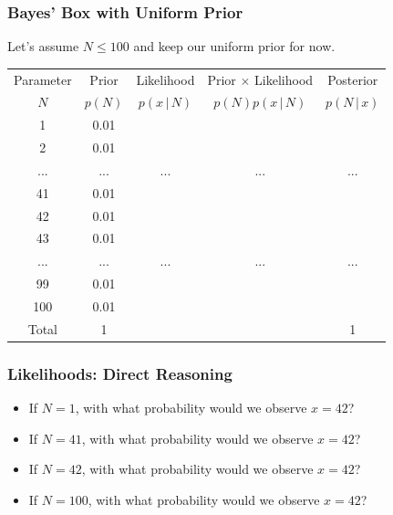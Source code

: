 \documentclass{beamer}
\newcommand{\given}{\,|\,}
\begin{document}
\begin{frame}
\frametitle{Bayes' Box with Uniform Prior}
Let's assume $N \leq 100$ and keep our uniform prior for now.

\centering
{\footnotesize
\begin{tabular}{|c|c|c|c|c|}
\hline
Parameter & Prior & Likelihood & Prior $\times$ Likelihood & Posterior \\
$N$  & $p(N)$ & $p(x \given N)$ & $p(N)p(x\given N)$ & $p(N\given x)$ \\
\hline
1 & 0.01 & & & \\
2 & 0.01  &  & & \\
... &... &... & ...&... \\
41 & 0.01 &  & & \\
42 & 0.01  &  & & \\
43 & 0.01 & & & \\
... &... &... & ...&... \\
99 & 0.01 & & & \\
100   & 0.01 & & & \\
\hline
Total & 1 & & & 1 \\
\hline
\end{tabular}
}

\end{frame}

\begin{frame}
\frametitle{Likelihoods: Direct Reasoning}

\begin{itemize}
\item If $N=1$, with what probability would we observe $x=42$? \pause
\item If $N=41$, with what probability would we observe $x=42$? \pause
\item If $N=42$, with what probability would we observe $x=42$? \pause
\item If $N=100$, with what probability would we observe $x=42$?
\end{itemize}

\end{frame}
\end{document}
